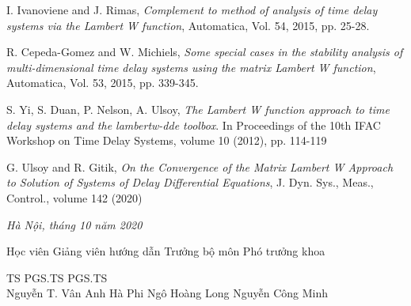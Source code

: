 \documentclass[12pt,oneside,portrait,a4paper]{book}
\theoremstyle{definition}
\theoremstyle{plain}
\begin{document}
\begin{thebibliography}{99}
I. Ivanoviene and J.	Rimas,	\emph{Complement	to	method	of	analysis	of	time	delay	systems	via	the	Lambert	W	function},	Automatica,	Vol.	54,	2015,	pp.	25-28.

 R. Cepeda-Gomez	and	W.	Michiels, \emph{Some	special	cases	in	the	stability analysis	of	multi-dimensional	time	delay	systems	using	the	matrix	Lambert	W	function},	Automatica, Vol.	53,	2015,	pp.	339-345.

S. Yi, S. Duan, P. Nelson, A. Ulsoy, \emph{The Lambert W function approach to time delay systems and the lambertw-dde toolbox}. In Proceedings of the 10th IFAC Workshop on Time Delay Systems, volume 10 (2012), pp. 114-119

G. Ulsoy and R. Gitik, \emph{On the Convergence of the Matrix Lambert W Approach to Solution of Systems of Delay Differential Equations}, J. Dyn. Sys., Meas., Control., volume 142 (2020)

\end{thebibliography}
\vspace{10pt}

\phantom{***}

\begin{flushright}
\textit{Hà Nội, tháng 10 năm 2020}
\end{flushright}
\par
\par
{\small
	\hspace {-0,1cm} Học viên \hspace {0.5cm} Giảng viên hướng dẫn \hspace {0.7cm} Trưởng bộ môn \hspace {1.2cm} Phó trưởng khoa \\
	\par
	\vspace{1cm}
	\noindent  \hspace{4.2cm} TS \hspace{3cm} PGS.TS \hspace{2.7cm} PGS.TS\\
	\noindent Nguyễn T. Vân Anh  \hspace*{0.9cm} Hà Phi \hspace{2,4cm}Ngô Hoàng Long \hspace{1,1cm} Nguyễn Công Minh
	
}
\end{document}
